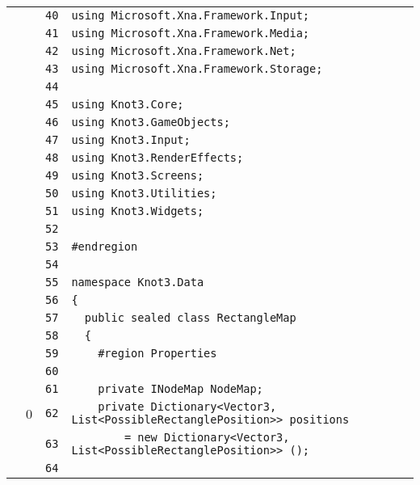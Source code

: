 \documentclass[a4paper,10pt]{article}
\begin{document}
\begin{longtable}[l]{lrrl}
\cellcolor{gray} &  & \verb~40~ & \verb~using Microsoft.Xna.Framework.Input;~\\
\cellcolor{gray} &  & \verb~41~ & \verb~using Microsoft.Xna.Framework.Media;~\\
\cellcolor{gray} &  & \verb~42~ & \verb~using Microsoft.Xna.Framework.Net;~\\
\cellcolor{gray} &  & \verb~43~ & \verb~using Microsoft.Xna.Framework.Storage;~\\
\cellcolor{gray} &  & \verb~44~ & \verb~~\\
\cellcolor{gray} &  & \verb~45~ & \verb~using Knot3.Core;~\\
\cellcolor{gray} &  & \verb~46~ & \verb~using Knot3.GameObjects;~\\
\cellcolor{gray} &  & \verb~47~ & \verb~using Knot3.Input;~\\
\cellcolor{gray} &  & \verb~48~ & \verb~using Knot3.RenderEffects;~\\
\cellcolor{gray} &  & \verb~49~ & \verb~using Knot3.Screens;~\\
\cellcolor{gray} &  & \verb~50~ & \verb~using Knot3.Utilities;~\\
\cellcolor{gray} &  & \verb~51~ & \verb~using Knot3.Widgets;~\\
\cellcolor{gray} &  & \verb~52~ & \verb~~\\
\cellcolor{gray} &  & \verb~53~ & \verb~#endregion~\\
\cellcolor{gray} &  & \verb~54~ & \verb~~\\
\cellcolor{gray} &  & \verb~55~ & \verb~namespace Knot3.Data~\\
\cellcolor{gray} &  & \verb~56~ & \verb~{~\\
\cellcolor{gray} &  & \verb~57~ & \verb~  public sealed class RectangleMap~\\
\cellcolor{gray} &  & \verb~58~ & \verb~  {~\\
\cellcolor{gray} &  & \verb~59~ & \verb~    #region Properties~\\
\cellcolor{gray} &  & \verb~60~ & \verb~~\\
\cellcolor{gray} &  & \verb~61~ & \verb~    private INodeMap NodeMap;~\\
\cellcolor{red} & 0 & \verb~62~ & \verb~    private Dictionary<Vector3, List<PossibleRectanglePosition>> positions~\\
\cellcolor{gray} &  & \verb~63~ & \verb~        = new Dictionary<Vector3, List<PossibleRectanglePosition>> ();~\\
\cellcolor{gray} &  & \verb~64~ & \verb~~\\

\end{longtable}
\end{document}
